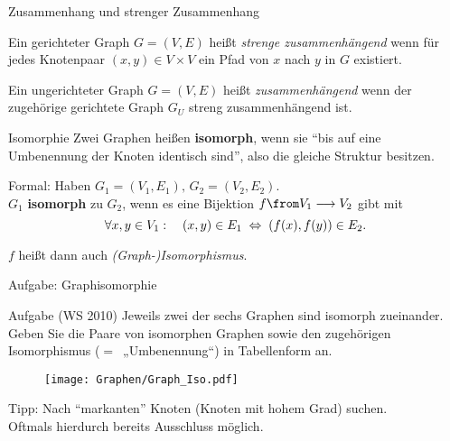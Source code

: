 \begin{frame}{Zusammenhang und strenger Zusammenhang}
	\begin{Definition}
		Ein gerichteter Graph $G=(V,E)$ heißt \emph{strenge zusammenhängend} wenn für jedes Knotenpaar $(x,y)\in V \times V$ ein Pfad von $x$ nach $y$ in $G$ existiert.
	\end{Definition}
	\pause
	\begin{Definition}
		Ein ungerichteter Graph $G=(V,E)$ heißt \emph{zusammenhängend} wenn der zugehörige gerichtete Graph $G_U$ streng zusammenhängend ist.
	\end{Definition}
\end{frame}


\begin{frame}{Isomorphie}
	Zwei Graphen heißen \textbf{isomorph}, wenn sie \enquote{bis auf eine Umbenennung der Knoten identisch sind}, also die gleiche Struktur besitzen.\\
	
	\pause
	\medskip
	
	Formal: Haben $G_1 = (V_1, E_1), \, G_2 = (V_2, E_2)$. \\ \smallskip
	$G_1$ \textbf{isomorph} zu $G_2$, wenn es eine Bijektion $f \from V_1 \functionto V_2$ gibt mit \[\forall x,y \in V_1: \quad (x,y) \in E_1 \gdw \tuple{f(x),f(y)} \in E_2. \]
	
	$f$ heißt dann auch \emph{(Graph-)Isomorphismus}.
	
\end{frame}

\begin{frame}{Aufgabe: Graphisomorphie}
	\begin{block}{Aufgabe (WS 2010)}
		Jeweils zwei der sechs Graphen sind isomorph zueinander. Geben Sie die Paare von isomorphen Graphen sowie den zugehörigen Isomorphismus ($=$~„Umbenennung“) in Tabellenform an.
		\begin{figure}[H]
			\centering
			\texttt{[image: Graphen/Graph\_Iso.pdf]}
		\end{figure}
	\end{block}
	Tipp: Nach \enquote{markanten} Knoten (Knoten mit hohem Grad) suchen.\\
	Oftmals hierdurch bereits Ausschluss möglich.
\end{frame}

